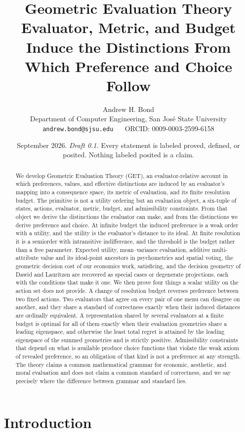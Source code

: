 \documentclass[11pt]{article}
\title{\textbf{Geometric Evaluation Theory}\\[4pt]
\large Evaluator, Metric, and Budget Induce the Distinctions From Which Preference and Choice Follow}
\author{Andrew H. Bond\\
\small Department of Computer Engineering, San Jos\'e State University\\
\small \texttt{andrew.bond@sjsu.edu} ~\textbar~ ORCID: 0009-0003-2599-6158}
\date{September 2026. \emph{Draft 0.1.} Every statement is labeled proved, defined, or posited. Nothing labeled posited is a claim.}
\theoremstyle{definition}
\theoremstyle{remark}
\begin{document}
\maketitle

\begin{abstract}
We develop Geometric Evaluation Theory (GET), an evaluator-relative account in which preferences, values, and effective distinctions are induced by an evaluator's mapping into a consequence space, its metric of evaluation, and its finite resolution budget.
The primitive is not a utility ordering but an evaluation object, a six-tuple of states, actions, evaluator, metric, budget, and admissibility constraints.
From that object we derive the distinctions the evaluator can make, and from the distinctions we derive preference and choice.
At infinite budget the induced preference is a weak order with a utility, and the utility is the evaluator's distance to its ideal.
At finite resolution it is a semiorder with intransitive indifference, and the threshold is the budget rather than a free parameter.
Expected utility, mean--variance evaluation, additive multi-attribute value and its ideal-point ancestors in psychometrics and spatial voting, the geometric decision cost of our economics work, satisficing, and the decision geometry of Dawid and Lauritzen are recovered as special cases or degenerate projections, each with the conditions that make it one.
We then prove four things a scalar utility on the action set does not provide.
A change of resolution budget reverses preference between two fixed actions.
Two evaluators that agree on every pair of one menu can disagree on another, and they share a standard of correctness exactly when their induced distances are ordinally equivalent.
A representation shared by several evaluators at a finite budget is optimal for all of them exactly when their evaluation geometries share a leading eigenspace, and otherwise the least total regret is attained by the leading eigenspace of the summed geometries and is strictly positive.
Admissibility constraints that depend on what is available produce choice functions that violate the weak axiom of revealed preference, so an obligation of that kind is not a preference at any strength.
The theory claims a common mathematical grammar for economic, aesthetic, and moral evaluation and does not claim a common standard of correctness, and we say precisely where the difference between grammar and standard lies.
\end{abstract}

\section{Introduction}
\end{document}
